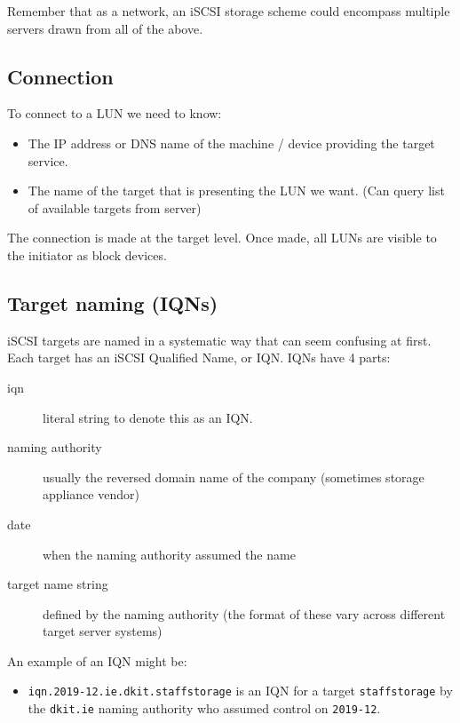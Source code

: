 Remember that as a network, an iSCSI storage scheme could encompass
multiple servers drawn from all of the above.

\subsection{Connection}\label{connection}

To connect to a LUN we need to know:

\begin{itemize}
\item
  The IP address or DNS name of the machine / device providing the
  target service.
\item
  The name of the target that is presenting the LUN we want. (Can query
  list of available targets from server)
\end{itemize}

The connection is made at the target level. Once made, all LUNs are
visible to the initiator as block devices.

\subsection{Target naming (IQNs)}\label{target-naming-iqns}

iSCSI targets are named in a systematic way that can seem confusing at
first. Each target has an iSCSI Qualified Name, or IQN. IQNs have 4
parts:

\begin{description}
\item[iqn]
literal string to denote this as an IQN.
\item[naming authority]
usually the reversed domain name of the company (sometimes storage
appliance vendor)
\item[date]
when the naming authority assumed the name
\item[target name string]
defined by the naming authority (the format of these vary across
different target server systems)
\end{description}

An example of an IQN might be:

\begin{itemize}
\item
  \texttt{iqn.2019-12.ie.dkit.staffstorage} is an IQN for a target
  \texttt{staffstorage} by the \texttt{dkit.ie} naming authority who
  assumed control on \texttt{2019-12}.
\end{itemize}


